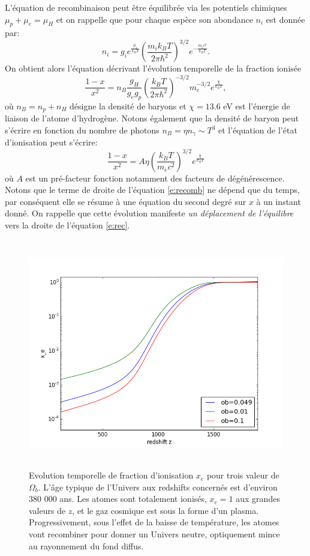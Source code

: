 L'équation de recombinaison peut être équilibrée via les potentiels chimiques $\mu_p+ \mu_e =\mu_H$ et on rappelle que pour chaque espèce son abondance $n_i$ est donnée par:
\begin{equation}
n_i=g_ie^{\frac{\mu_i}{k_BT}}\left(\frac{m_i k_B T}{2\pi\hbar^2}\right)^{3/2}e^{-\frac{m_i c^2}{k_B T}}.
\end{equation}
On obtient alors l'équation décrivant l'évolution temporelle de la fraction ionisée 
\begin{equation}
\frac{1-x}{x^2}=n_B \frac{g_H}{g_e g_p} \left(\frac{k_B T}{2\pi\hbar^2}\right)^{-3/2} m_e^{-3/2} e^{\frac{\chi}{k_B T}},
\end{equation}
où $n_B=n_p + n_H$ désigne la densité de baryons et $\chi=13.6$ eV est l'énergie de liaison de l'atome d'hydrogène. Notons également que la densité de baryon peut s'écrire en fonction du nombre de photons $n_B=\eta n_\gamma\sim T^3$ et l'équation de l'état d'ionisation peut s'écrire:
\begin{equation}
\frac{1-x}{x^2}=A \eta \left(\frac{k_B T}{m_e c^2}\right)^{3/2}e^{\frac{\chi}{k_B T}}
\label{e:recomb}
\end{equation}
où $A$ est un pré-facteur fonction notamment des facteurs de dégénérescence. Notons que le terme de droite de l'équation \ref{e:recomb} ne dépend que du temps, par conséquent elle se résume à une équation du second degré sur $x$ à un instant donné. On rappelle que cette évolution manifeste \textit{un déplacement de l'équilibre} vers  la droite de l'équation \ref{e:rec}.
\begin{figure}[htbp]
	\centering
		\includegraphics[height=10cm]{figs/recom.png}
		\caption{Evolution temporelle de fraction d'ionisation $x_e$ pour trois valeur de $\Omega_b$. L'âge typique de l'Univers aux redshifts concernés est d'environ 380 000 ans. Les atomes sont totalement ionisés, $x_e=1$ aux grandes valeurs de $z$, et le gaz cosmique est sous la forme d'un plasma. Progressivement, sous l'effet de la baisse de température, les atomes vont recombiner pour donner un Univers neutre, optiquement mince au rayonnement du fond diffus.}
	\label{f:recomb}
\end{figure}

